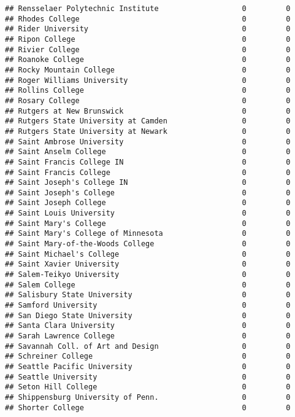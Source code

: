 \documentclass[
]{article}
\begin{document}
\begin{verbatim}
## Rensselaer Polytechnic Institute                   0         0
## Rhodes College                                     0         0
## Rider University                                   0         0
## Ripon College                                      0         0
## Rivier College                                     0         0
## Roanoke College                                    0         0
## Rocky Mountain College                             0         0
## Roger Williams University                          0         0
## Rollins College                                    0         0
## Rosary College                                     0         0
## Rutgers at New Brunswick                           0         0
## Rutgers State University at Camden                 0         0
## Rutgers State University at Newark                 0         0
## Saint Ambrose University                           0         0
## Saint Anselm College                               0         0
## Saint Francis College IN                           0         0
## Saint Francis College                              0         0
## Saint Joseph's College IN                          0         0
## Saint Joseph's College                             0         0
## Saint Joseph College                               0         0
## Saint Louis University                             0         0
## Saint Mary's College                               0         0
## Saint Mary's College of Minnesota                  0         0
## Saint Mary-of-the-Woods College                    0         0
## Saint Michael's College                            0         0
## Saint Xavier University                            0         0
## Salem-Teikyo University                            0         0
## Salem College                                      0         0
## Salisbury State University                         0         0
## Samford University                                 0         0
## San Diego State University                         0         0
## Santa Clara University                             0         0
## Sarah Lawrence College                             0         0
## Savannah Coll. of Art and Design                   0         0
## Schreiner College                                  0         0
## Seattle Pacific University                         0         0
## Seattle University                                 0         0
## Seton Hill College                                 0         0
## Shippensburg University of Penn.                   0         0
## Shorter College                                    0         0

\end{verbatim}
\end{document}
